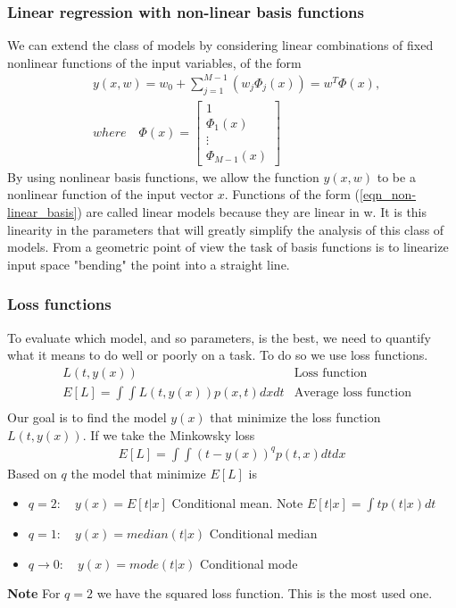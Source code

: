 \documentclass[main.tex]{subfiles}
\begin{document}
\subsubsection{Linear regression with non-linear basis functions}
We can extend the class of models by considering linear combinations of fixed nonlinear functions of the input variables, of the form
\begin{equation} \label{eqn_non-linear_basis}
    \begin{split}
        &y(x,w)=w_0+\sum_{j=1}^{M-1}(w_j\Phi_j(x))=w^T\Phi(x), \\
        & where \quad \Phi(x)=\begin{bmatrix}1\\ \Phi_1(x) \\ \vdots \\\Phi_{M-1}(x)\end{bmatrix}
    \end{split}
\end{equation}
By using nonlinear basis functions\footnotemark, we allow the function $y(x,w)$ to be a nonlinear
function of the input vector $x$. Functions of the form (\ref{eqn_non-linear_basis}) are called linear
models because they are linear in w. It is this linearity in the parameters
that will greatly simplify the analysis of this class of models. From a geometric point of view the task of basis functions is to linearize input space "bending" the point into a straight line.


\subsubsection{Loss functions}
To evaluate which model, and so parameters, is the best, we need to quantify what it means to do well or poorly on a task. To do so we use loss functions.
\begin{align*}
    &L(t,y(x)) &\text{Loss function}\\
    &E[L]=\int\int L(t,y(x))p(x,t)dxdt &\text{Average loss function}\\
\end{align*}
Our goal is to find the model $y(x)$ that minimize the loss function $L(t,y(x))$.
If we take the Minkowsky loss
\begin{equation}
    \begin{split}
        E[L]=\int \int (t-y(x))^qp(t,x)dtdx
    \end{split}
\end{equation}
Based on $q$ the model that minimize $E[L]$ is
\begin{itemize}
    \item $q=2: \quad y(x) = E[t|x]$ Conditional mean. Note $E[t|x]=\int tp(t|x)dt$
    \item $q=1: \quad y(x) = median(t|x)$ Conditional median
    \item $q\xrightarrow{}0: \quad y(x) = mode(t|x)$ Conditional mode
\end{itemize}
\textbf{Note} For $q=2$ we have the squared loss function. This is the most used one.
\end{document}
